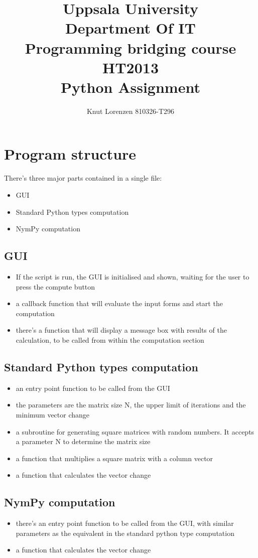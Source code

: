 \documentclass[11pt]{amsart}
\title{ Uppsala University\\ Department Of IT \\Programming bridging course HT2013 \\Python Assignment}
\author{Knut Lorenzen 810326-T296}
\date{}                                           %
\begin{document}
\maketitle

\section{Program structure}

There's  three major parts contained in a single file:
\begin{itemize}
\item GUI
\item Standard Python types computation
\item NymPy computation
\end{itemize}

\subsection{GUI}
\begin{itemize}
\item If the script is run, the GUI is initialised and shown, waiting for the user to press the compute button
\item a callback function that will evaluate the input forms and start the computation
\item there's a function that will display a message box with results of the calculation, to be called from within the computation section
\end{itemize}

\subsection{Standard Python types computation}
\begin{itemize}
\item an entry point function to be called from the GUI
\item the parameters are the matrix size N, the upper limit of iterations and the minimum vector change
\item a subroutine for generating square matrices with random numbers. 
It accepts a parameter N to determine the matrix size
\item a function that multiplies a square matrix with a column vector
\item a function that calculates the vector change
\end{itemize}

\subsection{NymPy computation}
\begin{itemize}
\item there's an entry point function to be called from the GUI, with similar parameters as the equivalent in the standard python type computation
\item a function that calculates the vector change
\end{itemize}
\end{document}
